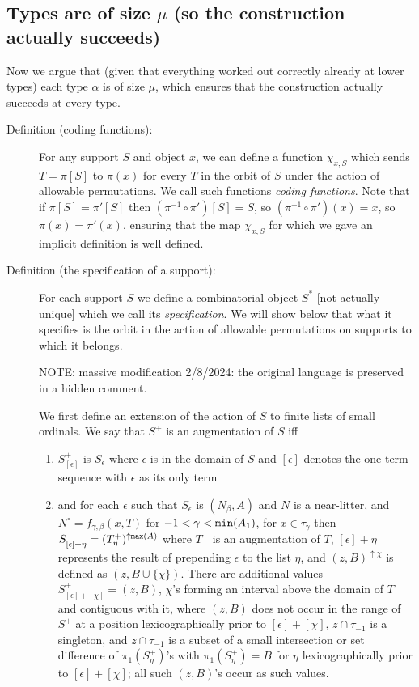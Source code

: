 \documentclass[112pt]{article}
\begin{document}
\newpage
\subsection{Types are of size $\mu$ (so the construction actually succeeds)}

Now we argue that (given that everything worked out correctly already at lower types) each type $\alpha$ is of size $\mu$, which ensures
that the construction actually succeeds at every type.

\begin{description}


\item[Definition (coding functions):]  For any support $S$ and object $x$, we can define a function $\chi_{x,S}$ which sends $T=\pi[S]$ to $\pi(x)$ for every $T$ in the orbit of $S$ under
the action of allowable permutations.  We call such functions {\em coding functions\/}.  Note that if $\pi[S]=\pi'[S]$ then $(\pi^{-1}\circ \pi')[S]= S$, so 
$(\pi^{-1}\circ \pi')(x)= x$, so $\pi(x)=\pi'(x)$, ensuring that the map $\chi_{x,S}$ for which we gave an implicit definition is well defined.

\item[Definition (the specification of a support):]   For each support $S$ we define a combinatorial object $S^*$ [not actually unique]  which we call its {\em specification\/}.  We will show below that what it specifies is the orbit in the action of allowable permutations on supports to which it belongs.

NOTE:  massive modification 2/8/2024:  the original language is preserved in a hidden comment.

We first define an extension of the action of $S$ to finite lists of small ordinals.  We say that $S^+$ is an augmentation of $S$ iff  

\begin{enumerate}
\item $S^+_{[\epsilon]}$ is $S_\epsilon$ where $\epsilon$ is in the domain of $S$ and $[\epsilon]$ denotes the one term sequence with $\epsilon$ as its only term
\item and for each $\epsilon$ such that $S_\epsilon$ is $(N_\beta,A)$ and $N$ is a near-litter, and $N^\circ=f_{\gamma,\beta}(x,T)$ for $-1<\gamma<{\tt min}(A_1)$, for $x\in \tau_\gamma$ then $S^+_{[\epsilon]+\eta} = (T^+_{\eta})^{\uparrow {\tt max}(A)}$  where $T^+$ is an augmentation of $T$, $[\epsilon]+\eta$ represents
the result of prepending $\epsilon$ to the list $\eta$, and $(z,B)^{\uparrow \chi}$ is defined as $(z,B \cup \{\chi\})$.  There are additional values $S^+_{[\epsilon]+[\chi]} = (z,B)$, $\chi$'s forming an interval above the domain of $T$ and contiguous with it, where $(z,B)$ does not occur in the range of $S^+$ at a position lexicographically prior to $[\epsilon]+[\chi]$,
$z \cap \tau_{-1}$ is a singleton, and $z \cap \tau_{-1}$ is a subset of a small intersection or set difference of $\pi_1(S^+_\eta)$'s with $\pi_1(S^+_\eta)=B$ for $\eta$ lexicographically prior to $[\epsilon]+[\chi]$; all such $(z,B)$'s occur as such values.


\end{enumerate}
\end{description}
\end{document}
